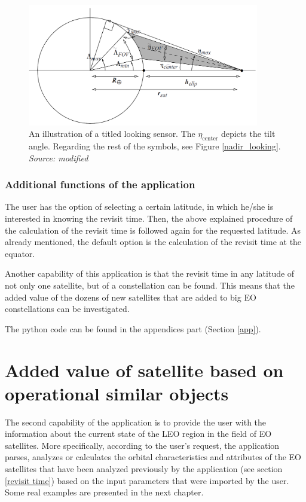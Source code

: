 \begin{figure}
\centering
\includegraphics[width=0.9\textwidth]{Images/tilted_looking.png}\caption{An illustration of a titled looking sensor. The $\eta_{\text{center}}$ depicts the tilt angle. Regarding the rest of the symbols, see Figure \ref{nadir_looking}. \textit{Source: modified \cite{Vallado}}}
\label{tilted_looking}
\end{figure}

\bigskip
\subsubsection{Additional functions of the application}
\bigskip
The user has the option of selecting a certain latitude, in which he/she is interested in knowing the revisit time. Then, the above explained procedure of the calculation of the revisit time is followed again for the requested latitude. As already mentioned, the default option is the calculation of the revisit time at the equator.

Another capability of this application is that the revisit time in any latitude of not only one satellite, but of a constellation can be found. This means that the added value of the dozens of new satellites that are added to big EO constellations can be investigated.

\bigskip
The python code can be found in the appendices part (Section \ref{app}).

\bigskip
\section{Added value of satellite based on operational similar objects}
\label{added value}
\bigskip

The second capability of the application is to provide the user with the information about the current state of the LEO region in the field of EO satellites. More specifically, according to the user's request, the application parses, analyzes or calculates the orbital characteristics and attributes of the EO satellites that have been analyzed previously by the application (see section \ref{revisit time}) based on the input parameters that were imported by the user. Some real examples are presented in the next chapter.

